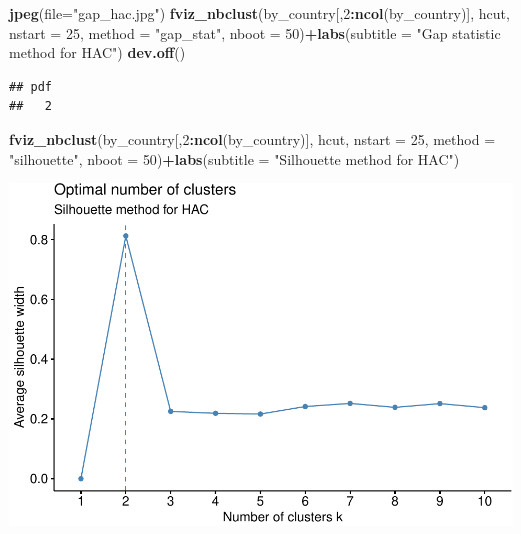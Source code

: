 \documentclass[]{article}
\newenvironment{Shaded}{\begin{snugshade}}{\end{snugshade}}
\newcommand{\DataTypeTok}[1]{\textcolor[rgb]{0.13,0.29,0.53}{#1}}
\newcommand{\DecValTok}[1]{\textcolor[rgb]{0.00,0.00,0.81}{#1}}
\newcommand{\KeywordTok}[1]{\textcolor[rgb]{0.13,0.29,0.53}{\textbf{#1}}}
\newcommand{\NormalTok}[1]{#1}
\newcommand{\OperatorTok}[1]{\textcolor[rgb]{0.81,0.36,0.00}{\textbf{#1}}}
\newcommand{\StringTok}[1]{\textcolor[rgb]{0.31,0.60,0.02}{#1}}
\begin{document}
\begin{Shaded}
\begin{Highlighting}[]
\KeywordTok{jpeg}\NormalTok{(}\DataTypeTok{file=}\StringTok{"gap_hac.jpg"}\NormalTok{)}
\KeywordTok{fviz_nbclust}\NormalTok{(by_country[,}\DecValTok{2}\OperatorTok{:}\KeywordTok{ncol}\NormalTok{(by_country)], hcut, }\DataTypeTok{nstart =} \DecValTok{25}\NormalTok{,  }\DataTypeTok{method =} \StringTok{"gap_stat"}\NormalTok{, }
             \DataTypeTok{nboot =} \DecValTok{50}\NormalTok{)}\OperatorTok{+}\KeywordTok{labs}\NormalTok{(}\DataTypeTok{subtitle =} \StringTok{"Gap statistic method for HAC"}\NormalTok{)}
\KeywordTok{dev.off}\NormalTok{()}
\end{Highlighting}
\end{Shaded}

\begin{verbatim}
## pdf 
##   2
\end{verbatim}

\begin{Shaded}
\begin{Highlighting}[]
\KeywordTok{fviz_nbclust}\NormalTok{(by_country[,}\DecValTok{2}\OperatorTok{:}\KeywordTok{ncol}\NormalTok{(by_country)], hcut, }\DataTypeTok{nstart =} \DecValTok{25}\NormalTok{,  }\DataTypeTok{method =} \StringTok{"silhouette"}\NormalTok{, }
             \DataTypeTok{nboot =} \DecValTok{50}\NormalTok{)}\OperatorTok{+}\KeywordTok{labs}\NormalTok{(}\DataTypeTok{subtitle =} \StringTok{"Silhouette method for HAC"}\NormalTok{)}
\end{Highlighting}
\end{Shaded}

\includegraphics{eda_files/figure-latex/unnamed-chunk-14-3.pdf}
\end{document}
